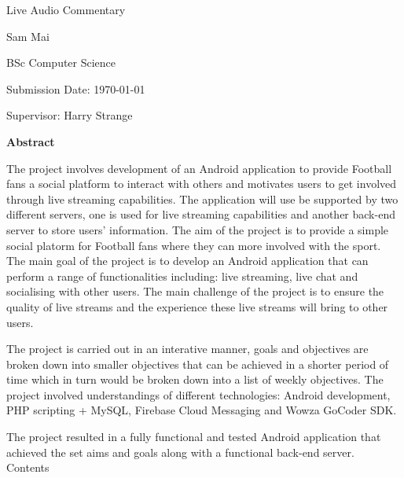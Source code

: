 \documentclass{article}
\begin{document}
\begin{center}
{\Huge Live Audio Commentary\\[5cm]}

{\Large Sam Mai

BSc Computer Science

Submission Date: \today

Supervisor: Harry Strange}
\end{center}
\newpage
\begin{center}
{\Large \textbf{Abstract}}
\end{center}
The project involves development of an Android application to provide Football fans a social platform to interact with others and motivates users to get involved through live streaming capabilities. The application will use be supported by two different servers, one is used for live streaming capabilities and another back-end server to store users' information. The aim of the project is to provide a simple social platorm for Football fans where they can more involved with the sport. The main goal of the project is to develop an Android application that can perform a range of functionalities including: live streaming, live chat and socialising with other users. The main challenge of the project is to ensure the quality of live streams and the experience these live streams will bring to other users.\par
\noindent The project is carried out in an interative manner, goals and objectives are broken down into smaller objectives that can be achieved in a shorter period of time which in turn would be broken down into a list of weekly objectives. The project involved understandings of different technologies: Android development, PHP scripting + MySQL, Firebase Cloud Messaging and Wowza GoCoder SDK.\par
\noindent The project resulted in a fully functional and tested Android application that achieved the set aims and goals along with a functional back-end server.\\
\newpage
Contents
\end{document}
